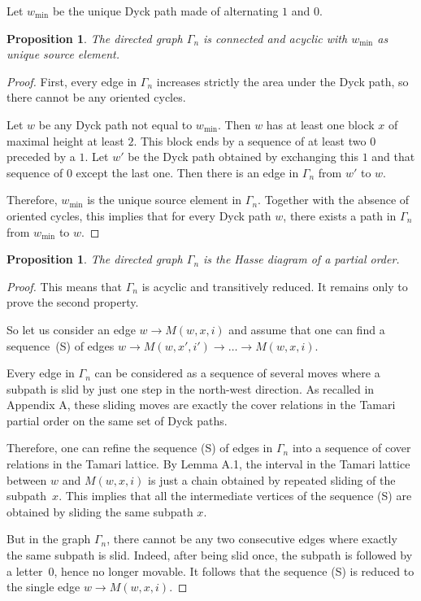 \documentclass[10pt]{article}
\newtheorem{prop}[theorem]{Proposition}
\theoremstyle{definition}
\newcommand{\wmin}{w_{\min}}
\begin{document}
Let $\wmin$ be the unique Dyck path made of
alternating $1$ and $0$.
\begin{prop}
  The directed graph $\Gamma_n$ is connected and acyclic with $\wmin$ as
  unique source element.
\end{prop}
\begin{proof}
  First, every edge in $\Gamma_n$ increases strictly the area under
  the Dyck path, so there cannot be any oriented cycles.

  Let $w$ be any Dyck path not equal to $\wmin$. Then $w$ has at
  least one block $x$ of maximal height at least $2$. This block ends by a
  sequence of at least two $0$ preceded by a $1$. Let $w'$ be the Dyck
  path obtained by exchanging this $1$ and that sequence of $0$ except
  the last one. Then there is an edge in $\Gamma_n$ from $w'$ to $w$.

  Therefore, $\wmin$ is the unique source element in
  $\Gamma_n$. Together with the absence of oriented cycles, this
  implies that for every Dyck path $w$, there exists a path in
  $\Gamma_n$ from $\wmin$ to $w$.
\end{proof}

\begin{prop}
  The directed graph $\Gamma_n$ is the Hasse diagram of a partial order.
\end{prop}
\begin{proof}
  This means that $\Gamma_n$ is acyclic and transitively reduced. It
  remains only to prove the second property.
  
  So let us consider an edge $w \to M(w,x,i)$ and assume that one can
  find a sequence~(S) of edges $w \to M(w,x',i') \to \dots \to M(w,x,i)$.

  Every edge in $\Gamma_n$ can be considered as a sequence of several
  moves where a subpath is slid by just one step in the north-west
  direction. As recalled in Appendix A, these sliding moves are
  exactly the cover relations in the Tamari partial order on the same
  set of Dyck paths.

  Therefore, one can refine the sequence (S) of edges in $\Gamma_n$
  into a sequence of cover relations in the Tamari lattice. By
  Lemma A.1, the interval in the Tamari lattice between $w$
  and $M(w,x,i)$ is just a chain obtained by repeated sliding of the subpath~$x$. 
  This implies that all the intermediate vertices of the
  sequence (S) are obtained by sliding the same subpath $x$.

  But in the graph $\Gamma_n$, there cannot be any two consecutive
  edges where exactly the same subpath is slid. Indeed, after being
  slid once, the subpath is followed by a letter~$0$, hence no
  longer movable. It follows that the sequence (S) is reduced to the
  single edge $w \to M(w,x,i)$.
\end{proof}
\end{document}
